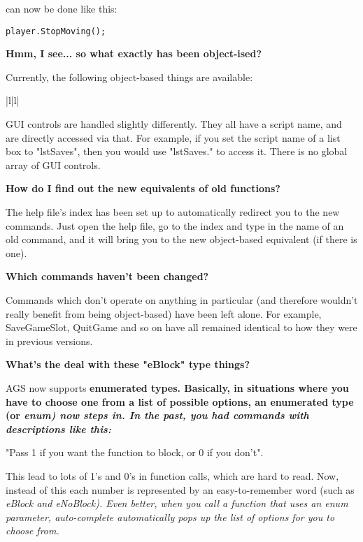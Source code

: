 can now be done like this:

\verb$player.StopMoving();$

\bf{Hmm, I see... so what exactly has been object-ised?}

Currently, the following object-based things are available:

\begin{tabular}{|l|l|}
\end{tabular}

GUI controls are handled slightly differently. They all have a script name,
and are directly accessed via that. For example, if you set the script name of
a list box to "lstSaves", then you would use "lstSaves." to access it. There is no
global array of GUI controls.

\bf{How do I find out the new equivalents of old functions?}

The help file's index has been set up to automatically redirect you to the new commands.
Just open the help file, go to the index and type in the name of an old command, and
it will bring you to the new object-based equivalent (if there is one).

\bf{Which commands haven't been changed?}

Commands which don't operate on anything in particular (and therefore wouldn't really
benefit from being object-based) have been left alone. For example, SaveGameSlot, QuitGame
and so on have all remained identical to how they were in previous versions.

\bf{What's the deal with these "eBlock" type things?}

AGS now supports \bf{enumerated types}. Basically, in situations where you have to choose
one from a list of possible options, an enumerated type (or \it{enum}) now steps in. In
the past, you had commands with descriptions like this:

"Pass 1 if you want the function to block, or 0 if you don't".

This lead to lots of 1's and 0's in function calls, which are hard to read. Now, instead
of this each number is represented by an easy-to-remember word (such as \it{eBlock} and
\it{eNoBlock}). Even better, when you call a function that uses an enum parameter,
auto-complete automatically pops up the list of options for you to choose from.


